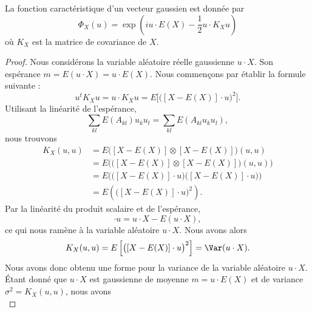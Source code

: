 \begin{proposition} \label{Propfmzuol}
	La fonction caractéristique d'un vecteur gaussien est donnée par
	\begin{equation}
		\Phi_X(u)=\exp\left( iu\cdot E(X)- \frac{ 1 }{2} u\cdot K_Xu \right)
	\end{equation}
	où \( K_X\) est la matrice de covariance de \( X\).
\end{proposition}

\begin{proof}
	Nous considérons la variable aléatoire réelle gaussienne \( u\cdot X\). Son espérance \( m=E(u\cdot X)=u\cdot E(X)\). Nous commençons par établir la formule suivante :
	\begin{equation}
		u^tK_Xu=u\cdot K_Xu=E\Big[ \big( [X-E(X)]\cdot u \big)^2 \Big].
	\end{equation}
	Utilisant la linéarité de l'espérance,
	\begin{equation}
		\sum_{kl}E(A_{kl})u_ku_l=\sum_{kl}E(A_{kl}u_ku_l),
	\end{equation}
	nous trouvons
	\begin{subequations}
		\begin{align}
			K_X(u,u) & =E\Big( [X-E(X)]\otimes [X-E(X)] \Big)(u,u)                          \\
			         & =E\Big( \big( [X-E(X)]\otimes [X-E(X)] \big)(u,u) \Big)              \\
			         & =E\Big( \big( [X-E(X)]\cdot u \big)\big( [X-E(X)]\cdot u \big) \Big) \\
			         & =E\left( \big( [X-E(X)]\cdot u \big)^2 \right).
		\end{align}
	\end{subequations}
	Par la linéarité du produit scalaire et de l'espérance,
	\begin{equation}
		[X-E(X)]\cdot u=u\cdot X-E(u\cdot X),
	\end{equation}
	ce qui nous ramène à la variable aléatoire \( u\cdot X\). Nous avons alors
	\begin{subequations}
		\begin{align}
			K_X(u,u)=E\left[ \big( [X-E(X)]\cdot u \big)^2 \right]=\Var(u\cdot X).
		\end{align}
	\end{subequations}
	Nous avons donc obtenu une forme pour la variance de la variable aléatoire \( u\cdot X\). Étant donné que \( u\cdot X\) est gaussienne de moyenne \( m=u\cdot E(X)\) et de variance \( \sigma^2=K_X(u,u)\), nous avons
	\begin{equation}    \label{EqJJftOX}

\end{equation}
\end{proof}
